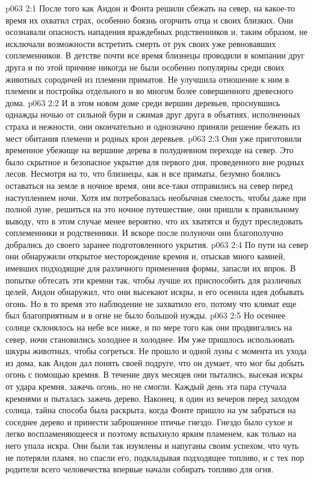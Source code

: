 \vs p063 2:1 После того как Андон и Фонта решили сбежать на север, на какое\hyp{}то время их охватил страх, особенно боязнь огорчить отца и своих близких. Они осознавали опасность нападения враждебных родственников и, таким образом, не исключали возможности встретить смерть от рук своих уже ревновавших соплеменников. В детстве почти все время близнецы проводили в компании друг друга и по этой причине никогда не были особенно популярны среди своих животных сородичей из племени приматов. Не улучшила отношение к ним в племени и постройка отдельного и во многом более совершенного древесного дома.
\vs p063 2:2 И в этом новом доме среди вершин деревьев, проснувшись однажды ночью от сильной бури и сжимая друг друга в объятиях, исполненных страха и нежности, они окончательно и однозначно приняли решение бежать из мест обитания племени и родных крон деревьев.
\vs p063 2:3 Они уже приготовили временное убежище на вершине дерева в полудневном переходе на север. Это было скрытное и безопасное укрытие для первого дня, проведенного вне родных лесов. Несмотря на то, что близнецы, как и все приматы, безумно боялись оставаться на земле в ночное время, они все\hyp{}таки отправились на север перед наступлением ночи. Хотя им потребовалась необычная смелость, чтобы даже при полной луне, решиться на это ночное путешествие, они пришли к правильному выводу, что в этом случае менее вероятно, что их хватятся и будут преследовать соплеменники и родственники. И вскоре после полуночи они благополучно добрались до своего заранее подготовленного укрытия.
\vs p063 2:4 По пути на север они обнаружили открытое месторождение кремня и, отыскав много камней, имевших подходящие для различного применения формы, запасли их впрок. В попытке обтесать эти кремни так, чтобы лучше их приспособить для различных целей, Андон обнаружил, что они высекают искры, и его осенила идея добывать огонь. Но в то время это наблюдение не захватило его, потому что климат еще был благоприятным и в огне не было большой нужды.
\vs p063 2:5 Но осеннее солнце склонялось на небе все ниже, и по мере того как они продвигались на север, ночи становились холоднее и холоднее. Им уже пришлось использовать шкуры животных, чтобы согреться. Не прошло и одной луны с момента их ухода из дома, как Андон дал понять своей подруге, что он думает, что мог бы добыть огонь с помощью кремня. В течение двух месяцев они пытались, высекая искры от удара кремня, зажечь огонь, но не смогли. Каждый день эта пара стучала кремнями и пыталась зажечь дерево. Наконец, в один из вечеров перед заходом солнца, тайна способа была раскрыта, когда Фонте пришло на ум забраться на соседнее дерево и принести заброшенное птичье гнездо. Гнездо было сухое и легко воспламеняющееся и поэтому вспыхнуло ярким пламенем, как только на него упала искра. Они были так изумлены и напуганы своим успехом, что чуть не потеряли пламя, но спасли его, подкладывая подходящее топливо, и с тех пор родители всего человечества впервые начали собирать топливо для огня.
